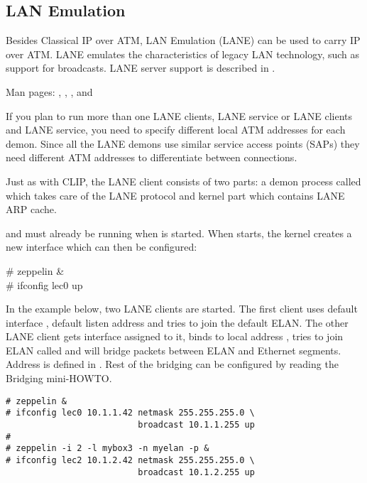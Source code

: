 \subsection{LAN Emulation}
\label{lane}

Besides Classical IP over ATM, LAN Emulation (LANE) can be used to
carry IP over ATM. LANE emulates the characteristics of legacy LAN
technology, such as support for broadcasts. LANE server support is
described in .

Man pages: , , , and 

If you plan to run more than one LANE clients, LANE service or LANE
clients and LANE service, you need to specify different local ATM
addresses for each demon. Since all the LANE demons use similar
service access points (SAPs) they need different ATM addresses to
differentiate between connections.

Just as with CLIP, the LANE client consists of two parts: a demon
process called  which takes care of the LANE protocol
and kernel part which contains LANE ARP cache.

 and  must already be running when
 is started. When  starts, the kernel
creates a new interface which can then be configured:

\begin{command}
\# zeppelin  \&\\
\# ifconfig lec0   up\\
\end{command}

In the example below, two LANE clients are started. The first client
uses default interface , default listen address and tries to
join the default ELAN. The other LANE client gets interface 
assigned to it, binds to local address , tries to join
ELAN called  and will bridge packets between ELAN and
Ethernet segments. Address  is defined in
. Rest of the bridging can be configured
by reading the Bridging mini-HOWTO.~\cite{bridge-howto}

\begin{verbatim}
# zeppelin &
# ifconfig lec0 10.1.1.42 netmask 255.255.255.0 \
                          broadcast 10.1.1.255 up
#
# zeppelin -i 2 -l mybox3 -n myelan -p &
# ifconfig lec2 10.1.2.42 netmask 255.255.255.0 \
                          broadcast 10.1.2.255 up
\end{verbatim}

